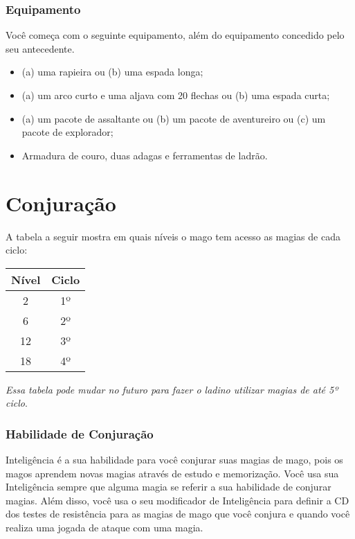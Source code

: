\documentclass{RPG_Adventure}[2021/10/20]
\begin{document}
\subsubsection{Equipamento}%

Você começa com o seguinte equipamento, além do equipamento concedido pelo seu
antecedente.
\begin{itemize}
    \item (a) uma rapieira ou (b) uma espada longa;
    \item (a) um arco curto e uma aljava com 20 flechas ou (b) uma espada curta;
    \item (a) um pacote de assaltante ou (b) um pacote de aventureiro ou (c) um
        pacote de explorador;
    \item Armadura de couro, duas adagas e ferramentas de ladrão.
\end{itemize}

\section*{Conjuração}%

A tabela a seguir mostra em quais níveis o mago tem acesso as magias de cada
ciclo:

\begin{center}
\begin{tabular}{|||c||c|||}
    \hline
    \textbf{Nível} & \textbf{Ciclo} \\
    \hline
    2 & 1º \\
    \hline
    6 & 2º \\
    \hline
    12 & 3º \\
    \hline
    18 & 4º \\
    \hline
\end{tabular}
\end{center}

\begin{obs}
\textit{Essa tabela pode mudar no futuro para fazer o ladino utilizar magias
de até 5º ciclo}.
\end{obs}

\subsubsection*{Habilidade de Conjuração}%

Inteligência é a sua habilidade para você conjurar suas magias de mago, pois os
magos aprendem novas magias através de estudo e memorização. Você usa sua
Inteligência sempre que alguma magia se referir a sua habilidade de conjurar
magias. Além disso, você usa o seu modificador de Inteligência para definir a CD
dos testes de resistência para as magias de mago que você conjura e quando você
realiza uma jogada de ataque com uma magia.
\end{document}

